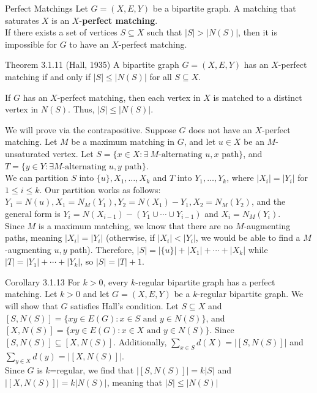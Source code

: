 \documentclass[10pt]{extarticle}
\begin{document}
  \begin{problem}{Perfect Matchings}
    Let $G = (X,E,Y)$ be a bipartite graph. A matching that saturates $X$ is an $X$-\textbf{perfect matching}.\\

    If there exists a set of vertices $S\subseteq X$ such that $|S| > |N(S)|$, then it is impossible for $G$ to have an $X$-perfect matching.
    \begin{problem}{Theorem 3.1.11 (Hall, 1935)}
      A bipartite graph $G = (X,E,Y)$ has an $X$-perfect matching if and only if $|S| \leq |N(S)|$ for all $S\subseteq X$.
      \tcblower
      \begin{description}[font=\normalfont\scshape]
        \item[($\Rightarrow$)] If $G$ has an $X$-perfect matching, then each vertex in $X$ is matched to a distinct vertex in $N(S)$. Thus, $|S| \leq |N(S)|$.
        \item[($\Leftarrow$)] We will prove via the contrapositive. Suppose $G$ does not have an $X$-perfect matching. Let $M$ be a maximum matching in $G$, and let $u\in X$ be an $M$-unsaturated vertex. Let $S = \{x\in X: \exists~M\textrm{-alternating $u,x$ path}\}$, and $T = \{y\in Y: \exists M\textrm{-alternating $u,y$ path}\}$.\\

          We can partition $S$ into $\{u\},X_1,\dots,X_k$ and $T$ into $Y_1,\dots,Y_k$, where $|X_i| = |Y_i|$ for $1\leq i\leq k$. Our partition works as follows: $Y_1 = N(u), X_1 = N_M(Y_1), Y_2 = N(X_1)-Y_1, X_2 = N_M(Y_2)$, and the general form is $Y_i = N(X_{i-1}) - (Y_1\cup \cdots \cup Y_{i-1})$ and $X_i = N_M(Y_i)$.\\

          Since $M$ is a maximum matching, we know that there are no $M$-augmenting paths, meaning $|X_i| = |Y_i|$ (otherwise, if $|X_i| < |Y_i|$, we would be able to find a $M$-augmenting $u,y$ path). Therefore, $|S| = |\{u\}| + |X_1| + \cdots + |X_k|$ while $|T| = |Y_1| + \cdots + |Y_k|$, so $|S| = |T| + 1$.
      \end{description}
    \end{problem}
    \begin{problem}{Corollary 3.1.13}
      For $k>0$, every $k$-regular bipartite graph has a perfect matching.
      \tcblower
      Let $k>0$ and let $G = (X,E,Y)$ be a $k$-regular bipartite graph. We will show that $G$ satisfies Hall's condition. Let $S\subseteq X$ and $[S,N(S)] = \{xy\in E(G): x\in S \textrm{ and } y\in N(S)\}$, and $[X,N(S)] = \{xy\in E(G): x\in X \textrm{ and } y\in N(S)\}$. Since $[S,N(S)] \subseteq [X,N(S)]$. Additionally, $\sum_{x\in S} d(X) = |[S,N(S)]|$ and $\sum_{y\in X}d(y) = |[X,N(S)]|$.\\

      Since $G$ is $k$=regular, we find that $|[S,N(S)]| = k|S|$ and $|[X,N(S)]| = k|N(S)|$, meaning that $|S| \leq |N(S)|$
    \end{problem}
  \end{problem}
\end{document}
